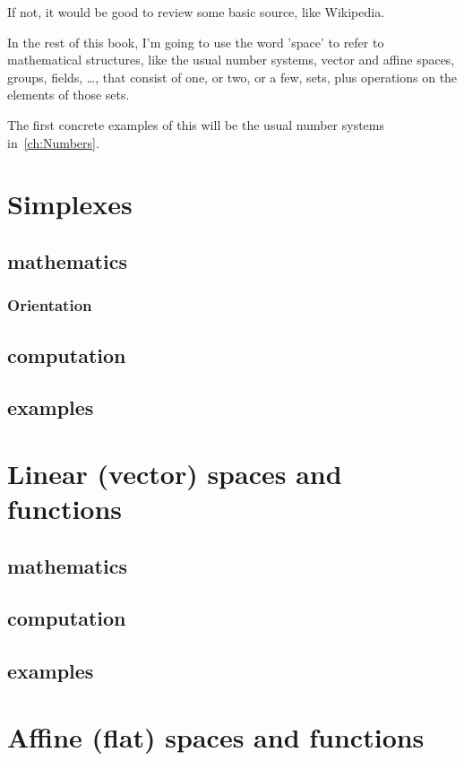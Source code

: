 \documentclass[10pt,openany]{book}
\begin{document}
If not, it would be good to review some basic source, like Wikipedia.

In the rest of this book, I'm going to use the word 'space' to refer to
mathematical structures, like the usual number systems, vector and affine
spaces, groups, fields, \ldots, that consist of one, or two, or a few, sets,
plus operations on the elements of those sets.

The first concrete examples of this will be the usual number systems 
in~\autoref{ch:Numbers}.





\chapter{Simplexes}
\section{mathematics}
\subsection{Orientation}
\section{computation}
\section{examples}

\chapter{Linear (vector) spaces and functions}
\section{mathematics}
\cite{Halmos1960Finite}
\section{computation}
\section{examples}

\chapter{Affine (flat) spaces and functions}
\end{document}
